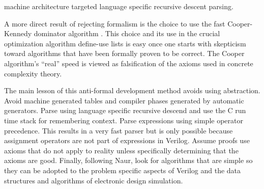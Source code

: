 \documentclass[preprint, authoryear]{sigplanconf}
\begin{document}
machine architecture targeted language specific recursive descent parsing.
\par
A more direct result of rejecting formalism is the choice
to use the fast Cooper-Kennedy dominator algorithm \cite{Cooper2006}.
This choice and its use in the crucial optimization algorithm define-use
lists is easy once one starts with skepticism toward algorithms that have
been formally proven to be correct.
The Cooper algorithm's ``real'' speed is viewed as
falsification of the axioms used in concrete complexity theory.
\par
The main lesson of this anti-formal development method avoids using
abstraction.
Avoid machine generated tables and compiler phases generated by automatic
generators.
Parse using language specific recursive descend and use the C run time
stack for remembering context.  Parse expressions using simple
operator precedence.  This results in a very fast parser 
but is only possible because assignment operators are not part of expressions
in Verilog.  Assume proofs use axioms that do not apply to reality unless 
specifically determining that the axioms are good.  Finally, following Naur,
look for algorithms that are simple so they can be adopted to the problem
specific aspects of Verilog and the data structures and algorithms
of electronic design simulation.
\end{document}
